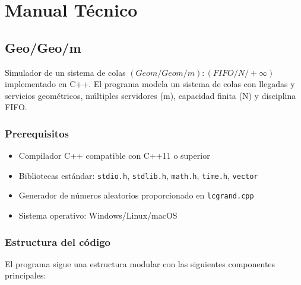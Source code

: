 \documentclass{article}
\begin{document}

\section{Manual Técnico}

\subsection{Geo/Geo/m}\label{subsec:geogeo_m}

Simulador de un sistema de colas $(Geom/Geom/m):(FIFO/N/+ \infty)$ implementado en C++. El programa modela un sistema de colas con llegadas y servicios geométricos, múltiples servidores (m), capacidad finita (N) y disciplina FIFO.

\subsubsection{Prerequisitos}

\begin{itemize}
    \item Compilador C++ compatible con C++11 o superior
    \item Bibliotecas estándar: \texttt{stdio.h}, \texttt{stdlib.h}, \texttt{math.h}, \texttt{time.h}, \texttt{vector}
    \item Generador de números aleatorios proporcionado en \texttt{lcgrand.cpp}
    \item Sistema operativo: Windows/Linux/macOS
\end{itemize}

\subsubsection{Estructura del código}

El programa sigue una estructura modular con las siguientes componentes principales:
\end{document}
